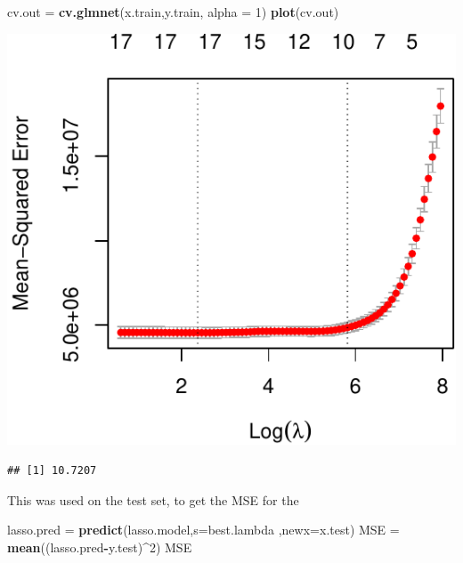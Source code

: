 \documentclass[]{article}
\newenvironment{Shaded}{\begin{snugshade}}{\end{snugshade}}
\newcommand{\DataTypeTok}[1]{\textcolor[rgb]{0.13,0.29,0.53}{#1}}
\newcommand{\DecValTok}[1]{\textcolor[rgb]{0.00,0.00,0.81}{#1}}
\newcommand{\KeywordTok}[1]{\textcolor[rgb]{0.13,0.29,0.53}{\textbf{#1}}}
\newcommand{\NormalTok}[1]{#1}
\newcommand{\OperatorTok}[1]{\textcolor[rgb]{0.81,0.36,0.00}{\textbf{#1}}}
\newcommand{\StringTok}[1]{\textcolor[rgb]{0.31,0.60,0.02}{#1}}
\begin{document}
\begin{Shaded}
\begin{Highlighting}[]
\NormalTok{cv.out =}\StringTok{ }\KeywordTok{cv.glmnet}\NormalTok{(x.train,y.train, }\DataTypeTok{alpha =} \DecValTok{1}\NormalTok{)}
\KeywordTok{plot}\NormalTok{(cv.out)}
\end{Highlighting}
\end{Shaded}

\begin{center}\includegraphics{Compulsory2_Group37_StatLearn_files/figure-latex/unnamed-chunk-10-1} \end{center}

\begin{Shaded}
\end{Shaded}

\begin{verbatim}
## [1] 10.7207
\end{verbatim}

This was used on the test set, to get the MSE for the

\begin{Shaded}
\begin{Highlighting}[]
\NormalTok{lasso.pred =}\StringTok{ }\KeywordTok{predict}\NormalTok{(lasso.model,}\DataTypeTok{s=}\NormalTok{best.lambda ,}\DataTypeTok{newx=}\NormalTok{x.test)}
\NormalTok{MSE =}\StringTok{ }\KeywordTok{mean}\NormalTok{((lasso.pred}\OperatorTok{-}\NormalTok{y.test)}\OperatorTok{^}\DecValTok{2}\NormalTok{)}
\NormalTok{MSE}
\end{Highlighting}
\end{Shaded}
\end{document}
